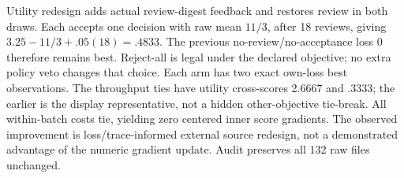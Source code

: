 Utility redesign adds actual review-digest feedback and restores review in both
draws. Each accepts one decision with raw mean $11/3$, after 18 reviews, giving
$3.25-11/3+.05(18)=.4833$. The previous no-review/no-acceptance loss 0 therefore
remains best. Reject-all is legal under the declared objective; no extra policy
veto changes that choice. Each arm has two exact own-loss best observations.
The throughput ties have utility cross-scores 2.6667 and .3333; the earlier is the
display representative, not a hidden other-objective tie-break. All within-batch
costs tie, yielding zero centered inner score gradients. The observed improvement
is loss/trace-informed external source redesign, not a demonstrated advantage of
the numeric gradient update. Audit preserves all 132 raw files unchanged.


